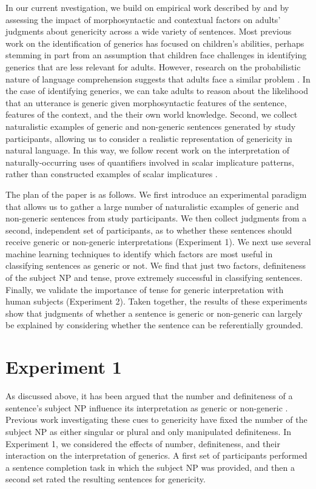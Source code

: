 \documentclass[10pt,letterpaper]{article}
\begin{document}
In our current nvestigation, we build on empirical work described by  and  by assessing the impact of morphosyntactic and contextual factors on adults' judgments about genericity across a wide variety of sentences. Most previous work on the identification of generics has focused on children's abilities, perhaps stemming in part from an assumption that children face challenges in identifying generics that are less relevant for adults. However, research on the probabilistic nature of language comprehension suggests that adults face a similar problem \cite{Levy:2008,Frank:2012}. In the case of identifying generics, we can take adults to reason about the likelihood that an utterance is generic given morphosyntactic features of the sentence, features of the context, and the their own world knowledge. Second, we collect naturalistic examples of generic and non-generic sentences generated by study participants, allowing us to consider a realistic representation of genericity in natural language. In this way, we follow recent work on the interpretation of naturally-occurring uses of quantifiers involved in scalar implicature patterns, rather than constructed examples of scalar implicatures \cite{Degen:2015}.

The plan of the paper is as follows. We first introduce an experimental paradigm that allows us to gather a large number of naturalistic examples of generic and non-generic sentences from study participants. We then collect judgments from a second, independent set of participants, as to whether these sentences should receive generic or non-generic interpretations (Experiment 1). We next use several machine learning techniques to identify which factors are most useful in classifying sentences as generic or not. We find that just two factors, definiteness of the subject NP and tense, prove extremely successful in classifying sentences. Finally, we validate the importance of tense for generic interpretation with human subjects (Experiment 2). Taken together, the results of these experiments show that judgments of whether a sentence is generic or non-generic can largely be explained by considering whether the sentence can be referentially grounded.

\section{Experiment 1}

As discussed above, it has been argued that the number and definiteness of a sentence's subject NP influence its interpretation as generic or non-generic \cite{Carlson:1977,Krifka:1995,Lyons:1977}. Previous work investigating these cues to genericity have fixed the number of the subject NP as either singular \cite{Cimpian:2011} or plural \cite{Gelman:2003} and only manipulated definiteness. In Experiment 1, we considered the effects of number, definiteness, and their interaction on the interpretation of generics. A first set of participants performed a sentence completion task in which the subject NP was provided, and then a second set rated the resulting sentences for genericity.
\end{document}
